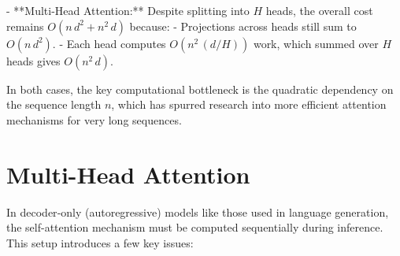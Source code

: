 - **Multi-Head Attention:**  
  Despite splitting into \( H \) heads, the overall cost remains \( O(n\, d^2 + n^2\, d) \) because:
  - Projections across heads still sum to \( O(n\, d^2) \).
  - Each head computes \( O(n^2\, (d/H)) \) work, which summed over \( H \) heads gives \( O(n^2\, d) \).

In both cases, the key computational bottleneck is the quadratic dependency on the sequence length \( n \), which has spurred research into more efficient attention mechanisms for very long sequences.


\section{Multi-Head Attention}
\label{sec:transformer:mha}

In decoder‐only (autoregressive) models like those used in language generation, the self-attention mechanism must be computed sequentially during inference. This setup introduces a few key issues:

